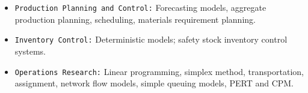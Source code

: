 \documentclass{article}
\begin{document}
{\begin{multicols}{2}
\begin{itemize}
\begin{itemize}
\item \texttt{Production Planning and Control:} Forecasting models, aggregate production planning, scheduling, materials requirement planning.
\item \texttt{Inventory Control:} Deterministic models; safety stock inventory control systems.
\item \texttt{Operations Research:} Linear programming, simplex method, transportation, assignment, network flow models, simple queuing models, PERT and CPM.
\end{itemize}
\end{itemize}
\end{multicols}
}
\end{document}
